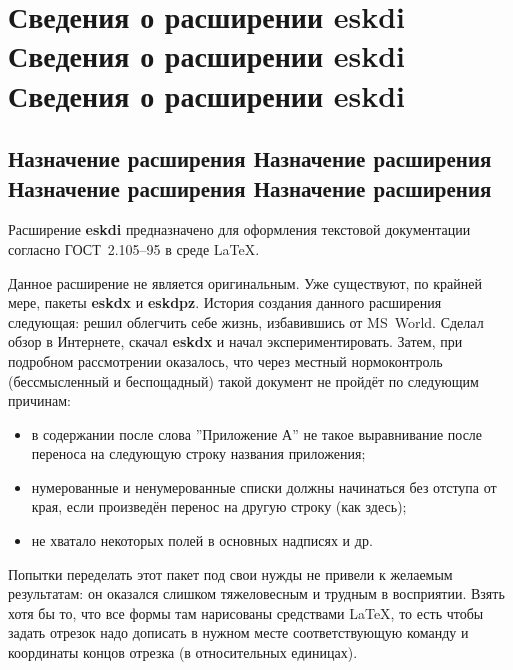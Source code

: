 \section{Сведения о расширении eskdi  Сведения о расширении eskdi  Сведения о расширении eskdi}


\subsection{Назначение расширения Назначение расширения Назначение расширения Назначение расширения}

Расширение \textbf{eskdi} предназначено для оформления текстовой документации согласно ГОСТ~2.105–95 в среде \LaTeX.

Данное расширение не является оригинальным. Уже существуют, по крайней мере, пакеты \textbf{eskdx} и \textbf{eskdpz}.
История создания данного расширения следующая: решил облегчить себе жизнь, избавившись от MS~World.
Сделал обзор в Интернете, скачал \textbf{eskdx} и начал экспериментировать. Затем, при подробном рассмотрении оказалось, что через местный нормоконтроль (бессмысленный и беспощадный) такой документ не пройдёт по следующим причинам:
\begin{itemize}
  \item в содержании после слова ''Приложение А'' не такое выравнивание после переноса на следующую строку названия приложения; 
  \item нумерованные и ненумерованные списки должны начинаться без отступа от края, если произведён перенос на другую строку (как здесь);
  \item не хватало некоторых полей в основных надписях и др.
\end{itemize}

Попытки переделать этот пакет под свои нужды не привели к желаемым результатам: он оказался слишком тяжеловесным и трудным в восприятии. Взять хотя бы то, что все формы там нарисованы средствами \LaTeX, то есть чтобы задать отрезок надо дописать в нужном месте соответствующую команду и координаты концов отрезка (в относительных единицах).

